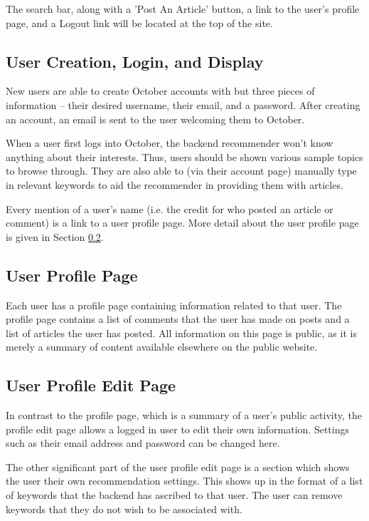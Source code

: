 \documentclass[11pt,letterpaper]{article}
\begin{document}
The search bar, along with a 'Post An Article' button, a link to the user's profile page, and a Logout link will be located at the top of the site.

\subsection{User Creation, Login, and Display}
New users are able to create October accounts with but three pieces of information --  their desired username, their email, and a password.
After creating an account, an email is sent to the user welcoming them to October.

When a user first logs into October, the backend recommender won't know anything about their interests.
Thus, users should be shown various sample topics to browse through.
They are also able to (via their account page) manually type in relevant keywords to aid the recommender in providing them with articles.

Every mention of a user's name (i.e. the credit for who posted an article or comment) is a link to a user profile page. More detail about the user profile page is given in Section \ref{sec:profilepage}.

\subsection{User Profile Page}
\label{sec:profilepage}
Each user has a profile page containing information related to that user.
The profile page contains a list of comments that the user has made on posts and a list of articles the user has posted.
All information on this page is public, as it is merely a summary of content available elsewhere on the public website.

\subsection{User Profile Edit Page}
In contrast to the profile page, which is a summary of a user's public activity, the profile edit page allows a logged in user to edit their own information.
Settings such as their email address and password can be changed here.

The other significant part of the user profile edit page is a section which shows the user their own recommendation settings.
This shows up in the format of a list of keywords that the backend has ascribed to that user.
The user can remove keywords that they do not wish to be associated with.
\end{document}
